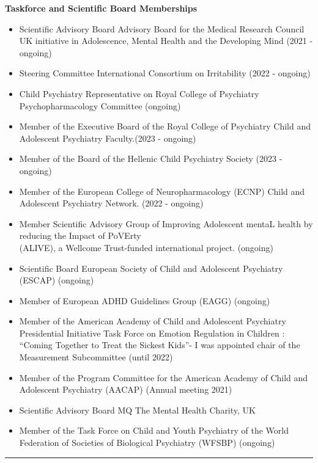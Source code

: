 \documentclass[
]{article}
\providecommand{\tightlist}{%
  \setlength{\itemsep}{0pt}\setlength{\parskip}{0pt}}
\begin{document}
\textbf{Taskforce and Scientific Board Memberships}

\begin{itemize}
\tightlist
\item
  Scientific Advisory Board Advisory Board for the Medical Research
  Council UK initiative in Adolescence, Mental Health and the Developing
  Mind (2021 - ongoing)
\item
  Steering Committee International Consortium on Irritability (2022 -
  ongoing)
\item
  Child Psychiatry Representative on Royal College of Psychiatry
  Psychopharmacology Committee (ongoing)
\item
  Member of the Executive Board of the Royal College of Psychiatry Child
  and Adolescent Psychiatry Faculty.(2023 - ongoing)
\item
  Member of the Board of the Hellenic Child Psychiatry Society (2023 -
  ongoing)
\item
  Member of the European College of Neuropharmacology (ECNP) Child and
  Adolescent Psychiatry Network. (2022 - ongoing)
\item
  Member Scientific Advisory Group of Improving Adolescent mentaL health
  by reducing the Impact of PoVErty\\
  (ALIVE), a Wellcome Trust-funded international project. (ongoing)
\item
  Scientific Board European Society of Child and Adolescent Psychiatry
  (ESCAP) (ongoing)
\item
  Member of European ADHD Guidelines Group (EAGG) (ongoing)
\item
  Member of the American Academy of Child and Adolescent Psychiatry
  Presidential Initiative Task Force on Emotion Regulation in Children :
  ``Coming Together to Treat the Sickest Kids''- I was appointed chair
  of the Measurement Subcommittee (until 2022)
\item
  Member of the Program Committee for the American Academy of Child and
  Adolescent Psychiatry (AACAP) (Annual meeting 2021)
\item
  Scientific Advisory Board MQ The Mental Health Charity, UK
\item
  Member of the Task Force on Child and Youth Psychiatry of the World
  Federation of Societies of Biological Psychiatry (WFSBP) (ongoing)
\end{itemize}

\begin{center}\rule{0.5\linewidth}{0.5pt}\end{center}
\end{document}
